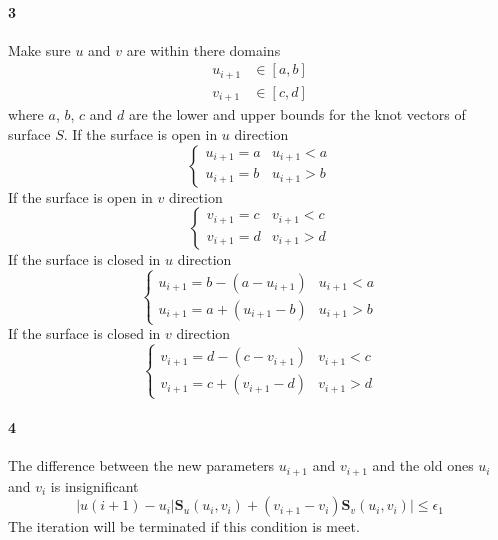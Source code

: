 \paragraph{3}
Make sure $u$ and $v$ are within there domains
\begin{align*}
    u_{i+1} & \in [a,b] \\
    v_{i+1} & \in [c,d]
\end{align*}
%
where $a$, $b$, $c$ and $d$ are the lower and upper bounds for the knot vectors of surface $S$.
If the surface is open in $u$ direction
\begin{equation}
    \left\{
        \begin{array}{rl}
            u_{i+1} = a & u_{i+1} < a \\
            u_{i+1} = b & u_{i+1} > b
        \end{array}
    \right.
\end{equation}
%
If the surface is open in $v$ direction
\begin{equation}
    \left\{
        \begin{array}{rl}
            v_{i+1} = c & v_{i+1} < c \\
            v_{i+1} = d & v_{i+1} > d
        \end{array}
    \right.
\end{equation}
%
If the surface is closed in $u$ direction
\begin{equation}
    \left\{
        \begin{array}{rl}
            u_{i+1} = b - ( a - u_{i+1} ) & u_{i+1} < a \\
            u_{i+1} = a + ( u_{i+1} - b ) & u_{i+1} > b
        \end{array}
    \right.
\end{equation}
%
If the surface is closed in $v$ direction
\begin{equation}
    \left\{
        \begin{array}{rl}
            v_{i+1} = d - ( c - v_{i+1} ) & v_{i+1} < c \\
            v_{i+1} = c + ( v_{i+1} - d ) & v_{i+1} > d
        \end{array}
    \right.
\end{equation}
%
\paragraph{4}
The difference between the new parameters $u_{i+1}$ and $v_{i+1}$ and the old ones $u_i$ and $v_i$ is insignificant
\begin{equation*}
    |u(i+1) - u_i| \mathbf{S}_u (u_i, v_i) +
    (v_{i+1} - v_i) \mathbf{S}_v (u_i, v_i) |
    \leq \epsilon_1
\end{equation*}
The iteration will be terminated if this condition is meet.